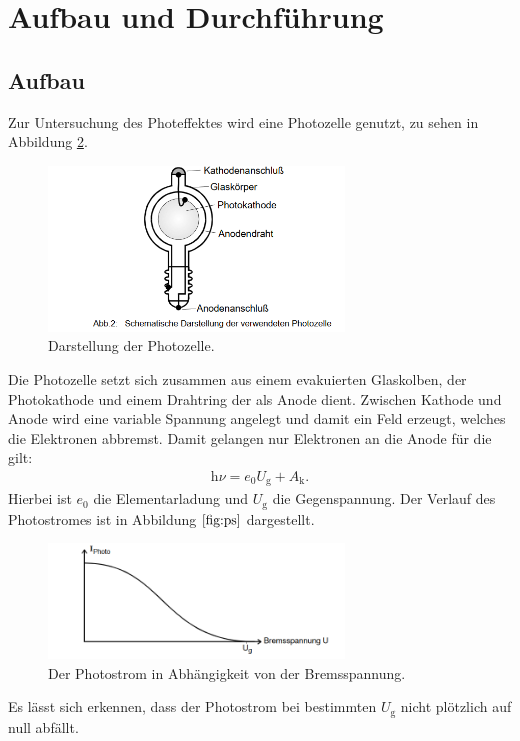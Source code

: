 \section{Aufbau und Durchführung}
\label{sec:Durchführung}
\subsection{Aufbau}
Zur Untersuchung des Photeffektes wird eine Photozelle genutzt, zu sehen in Abbildung \ref{fig:photozelle}.
\begin{figure}
 \centering
 \includegraphics[width=0.7\textwidth]{photozelle.png}
 \caption{Darstellung der Photozelle.\cite{sample}}
 \label{fig:photozelle}
\end{figure}
Die Photozelle setzt sich zusammen aus einem evakuierten Glaskolben, der Photokathode und einem Drahtring der als Anode dient.
Zwischen Kathode und Anode wird eine variable Spannung angelegt und damit ein Feld erzeugt, welches die Elektronen abbremst.
Damit gelangen nur Elektronen an die Anode für die gilt:
\begin{align}
\mathrm{h}\nu=e_\mathrm{0}U_\mathrm{g}+A_\mathrm{k}.
\end{align}
Hierbei ist $e_\mathrm{0}$ die Elementarladung und $U_\mathrm{g}$ die Gegenspannung.
Der Verlauf des Photostromes ist in Abbildung $\ref{fig:ps}$ dargestellt.
\begin{figure}
 \centering
 \includegraphics[width=0.7\textwidth]{ps.png}
 \caption{Der Photostrom in Abhängigkeit von der Bremsspannung.\cite{sample}}
 \label{fig:photozelle}
\end{figure}
Es lässt sich erkennen, dass der Photostrom bei bestimmten $U_\mathrm{g}$ nicht plötzlich auf null abfällt.
